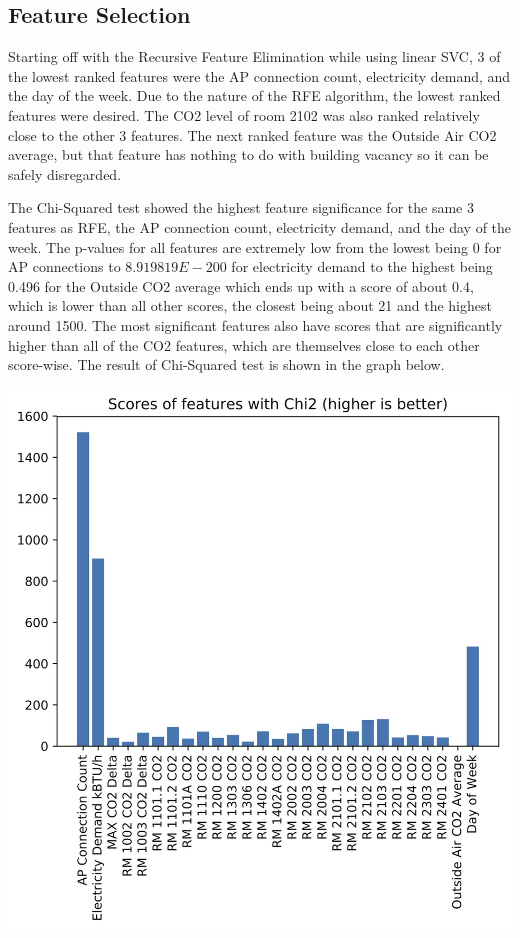 \documentclass[letterpaper, 12 pt, conference]{ieeeconf}  %
\begin{document}
\subsection{Feature Selection}

Starting off with the Recursive Feature Elimination while using linear SVC, 3 of the lowest ranked features were the AP connection count, electricity demand, and the day of the week. Due to the nature of the RFE algorithm, the lowest ranked features were desired. The CO2 level of room 2102 was also ranked relatively close to the other 3 features. The next ranked feature was the Outside Air CO2 average, but that feature has nothing to do with building vacancy so it can be safely disregarded.

The Chi-Squared test showed the highest feature significance for the same 3 features as RFE, the AP connection count, electricity demand, and the day of the week. The p-values for all features are extremely low from the lowest being 0 for AP connections to $8.919819E-200$ for electricity demand to the highest being 0.496 for the Outside CO2 average which ends up with a score of about 0.4, which is lower than all other scores, the closest being about 21 and the highest around 1500. The most significant features also have scores that are significantly higher than all of the CO2 features, which are themselves close to each other score-wise. The result of Chi-Squared test is shown in the graph below.

\begin{center}
        \includegraphics[scale=0.16]{../figures/chi2.jpg}
\end{center}
\end{document}

